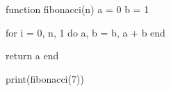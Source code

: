 function fibonacci(n)
    a = 0
    b = 1

    for i = 0, n, 1 do
        a, b = b, a + b
    end

    return a
end

print(fibonacci(7))